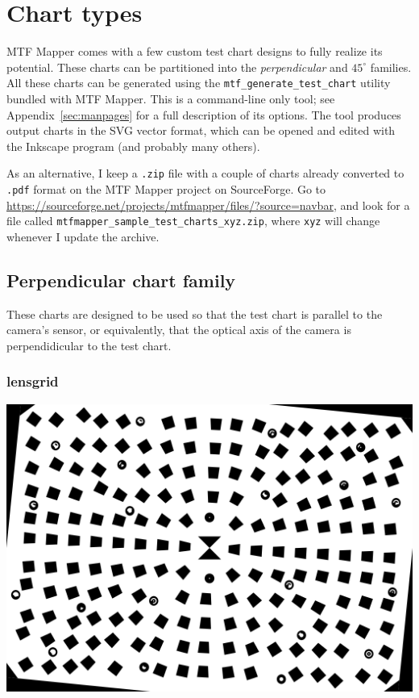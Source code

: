 \documentclass[a4paper]{article}
\begin{document}
\newpage

\section{Chart types}
\label{sec:chart_types}
MTF Mapper comes with a few custom test chart designs to fully realize its
potential. These charts can be partitioned into the \emph{perpendicular} and
\emph{$45^\circ$} families. All these charts can be generated using the
\texttt{mtf\_generate\_test\_chart} utility bundled with MTF Mapper. This is a
command-line only tool; see Appendix~\ref{sec:manpages} for a full
description of its options. The tool produces output charts in the SVG
vector format, which can be opened and edited with the Inkscape program (and
probably many others).

As an alternative, I keep a \texttt{.zip} file with a couple of charts
already converted to \texttt{.pdf} format on the MTF Mapper project on
SourceForge. Go to
\url{https://sourceforge.net/projects/mtfmapper/files/?source=navbar}, and
look for a file called \newline
\texttt{mtfmapper\_sample\_test\_charts\_xyz.zip}, \newline
where \texttt{xyz} will change whenever I update the archive.

\subsection{Perpendicular chart family}
These charts are designed to be used so that the test chart is parallel to
the camera's sensor, or equivalently, that the optical axis of the camera is
perpendidicular to the test chart.
\subsubsection{lensgrid}

\parbox{\textwidth}{
\centering
\includegraphics[width=\textwidth]{figures/chart_lensgrid}
}
\end{document}
